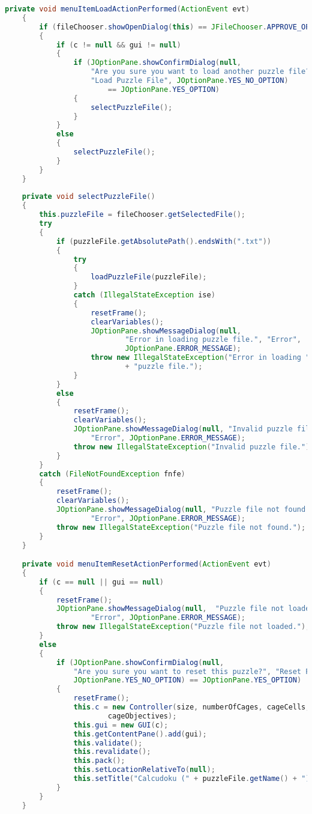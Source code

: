 \begin{lstlisting}[language=Java,basicstyle=\tiny,caption=Calcudoku.java]
    private void menuItemLoadActionPerformed(ActionEvent evt)
    {
        if (fileChooser.showOpenDialog(this) == JFileChooser.APPROVE_OPTION)
        {
            if (c != null && gui != null)
            {
                if (JOptionPane.showConfirmDialog(null,
                    "Are you sure you want to load another puzzle file?", 
                    "Load Puzzle File", JOptionPane.YES_NO_OPTION) 
                        == JOptionPane.YES_OPTION)
                {
                    selectPuzzleFile();
                }
            }
            else
            {
                selectPuzzleFile();
            }
        }
    }
    
    private void selectPuzzleFile()
    {
        this.puzzleFile = fileChooser.getSelectedFile();
        try
        {
            if (puzzleFile.getAbsolutePath().endsWith(".txt"))
            {
                try
                {
                    loadPuzzleFile(puzzleFile);
                }
                catch (IllegalStateException ise)
                {
                    resetFrame();
                    clearVariables();
                    JOptionPane.showMessageDialog(null, 
                            "Error in loading puzzle file.", "Error", 
                            JOptionPane.ERROR_MESSAGE);
                    throw new IllegalStateException("Error in loading " 
                            + "puzzle file.");
                }
            }
            else
            {
                resetFrame();
                clearVariables();
                JOptionPane.showMessageDialog(null, "Invalid puzzle file.",
                    "Error", JOptionPane.ERROR_MESSAGE);
                throw new IllegalStateException("Invalid puzzle file.");
            }
        }
        catch (FileNotFoundException fnfe)
        {                
            resetFrame();
            clearVariables();
            JOptionPane.showMessageDialog(null, "Puzzle file not found.",
                    "Error", JOptionPane.ERROR_MESSAGE);
            throw new IllegalStateException("Puzzle file not found.");
        }
    }

    private void menuItemResetActionPerformed(ActionEvent evt)
    {
        if (c == null || gui == null)
        {
            resetFrame();
            JOptionPane.showMessageDialog(null,  "Puzzle file not loaded.",
                    "Error", JOptionPane.ERROR_MESSAGE);
            throw new IllegalStateException("Puzzle file not loaded.");
        }
        else
        {
            if (JOptionPane.showConfirmDialog(null,
                "Are you sure you want to reset this puzzle?", "Reset Puzzle",
                JOptionPane.YES_NO_OPTION) == JOptionPane.YES_OPTION)
            {
                resetFrame();
                this.c = new Controller(size, numberOfCages, cageCells,
                        cageObjectives);
                this.gui = new GUI(c);
                this.getContentPane().add(gui);
                this.validate();
                this.revalidate();
                this.pack();
                this.setLocationRelativeTo(null);
                this.setTitle("Calcudoku (" + puzzleFile.getName() + ")");
            }
        }
    }
    

\end{lstlisting}

